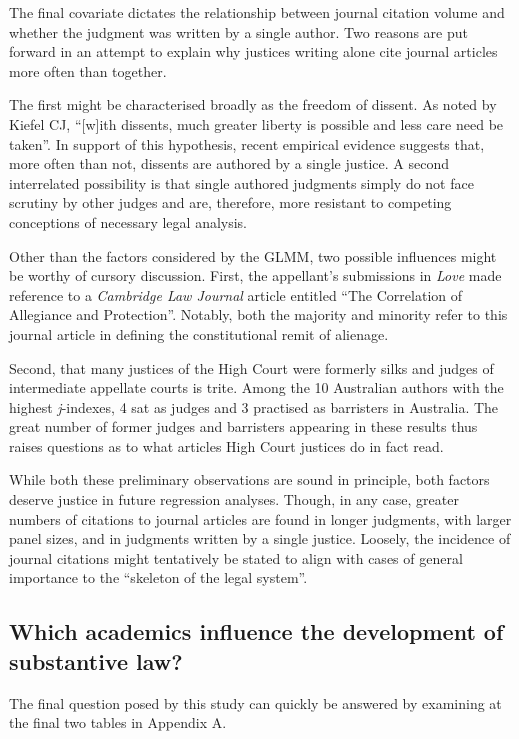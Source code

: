 The final covariate dictates the relationship between journal citation volume and whether the judgment was written by a single author. Two reasons are put forward in an attempt to explain why justices writing alone cite journal articles more often than together. 

The first might be characterised broadly as the freedom of dissent. As noted by Kiefel CJ, ``[w]ith dissents, much greater liberty is possible and less care need be taken''. In support of this hypothesis, recent empirical evidence suggests that, more often than not, dissents are authored by a single justice. A second interrelated possibility is that single authored judgments simply do not face scrutiny by other judges and are, therefore, more resistant to competing conceptions of necessary legal analysis.

Other than the factors considered by the GLMM, two possible influences might be worthy of cursory discussion. First, the appellant's submissions in \textit{Love} made reference to a \textit{Cambridge Law Journal} article entitled ``The Correlation of Allegiance and Protection''. Notably, both the majority and minority refer to this journal article in defining the constitutional remit of alienage. 

Second, that many justices of the High Court were formerly silks and judges of intermediate appellate courts is trite. Among the 10 Australian authors with the highest \textit{j}-indexes, 4 sat as judges and 3 practised as barristers in Australia. The great number of former judges and barristers appearing in these results thus raises questions as to what articles High Court justices do in fact read.

While both these preliminary observations are sound in principle, both factors deserve justice in future regression analyses. Though, in any case, greater numbers of citations to journal articles are found in longer judgments, with larger panel sizes, and in judgments written by a single justice. Loosely, the incidence of journal citations might tentatively be stated to align with cases of general importance to the ``skeleton of the legal system''.

\subsection{Which academics influence the development of substantive law?}

The final question posed by this study can quickly be answered by examining at the final two tables in Appendix A.
